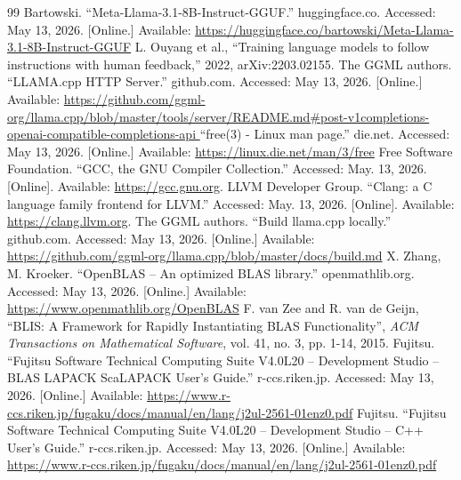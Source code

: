 \documentclass[11pt, a4paper]{article}
\begin{document}
\begin{thebibliography}{99}
        Bartowski.
        ``Meta-Llama-3.1-8B-Instruct-GGUF.''
        huggingface.co.
        Accessed: May 13, 2026. [Online.] Available:
        \url{https://huggingface.co/bartowski/Meta-Llama-3.1-8B-Instruct-GGUF}
        L. Ouyang et al.,
        ``Training language models to follow instructions with human feedback,''
        2022, arXiv:2203.02155.
        The GGML authors.
        ``LLAMA.cpp HTTP Server.''
        github.com.
        Accessed: May 13, 2026. [Online.] Available:
        \url{
            https://github.com/ggml-org/llama.cpp/blob/master/tools/server/README.md#post-v1completions-openai-compatible-completions-api
        }
        ``free(3) - Linux man page.''
        die.net.
        Accessed: May 13, 2026. [Online.] Available:
        \url{https://linux.die.net/man/3/free}
        Free Software Foundation.
        ``GCC, the GNU Compiler Collection.''
        Accessed: May. 13, 2026. [Online]. Available:
        \url{https://gcc.gnu.org}.
        LLVM Developer Group.
        ``Clang: a C language family frontend for LLVM.''
        Accessed: May. 13, 2026. [Online]. Available:
        \url{https://clang.llvm.org}.
        The GGML authors.
        ``Build llama.cpp locally.''
        github.com.
        Accessed: May 13, 2026. [Online.] Available:
        \url{https://github.com/ggml-org/llama.cpp/blob/master/docs/build.md}
        X. Zhang, M. Kroeker.
        ``OpenBLAS -- An optimized BLAS library.''
        openmathlib.org.
        Accessed: May 13, 2026. [Online.] Available:
        \url{https://www.openmathlib.org/OpenBLAS}
        F. van Zee and R. van de Geijn,
        ``BLIS: A Framework for Rapidly Instantiating BLAS Functionality'',
        \emph{ACM Transactions on Mathematical Software}, vol. 41, no. 3, pp. 1-14, 2015.
        Fujitsu.
        ``Fujitsu Software Technical Computing Suite V4.0L20 -- Development Studio -- BLAS LAPACK ScaLAPACK User's Guide.''
        r-ccs.riken.jp.
        Accessed: May 13, 2026. [Online.] Available:
        \url{https://www.r-ccs.riken.jp/fugaku/docs/manual/en/lang/j2ul-2561-01enz0.pdf}
        Fujitsu.
        ``Fujitsu Software Technical Computing Suite V4.0L20 -- Development Studio -- C++ User's Guide.''
        r-ccs.riken.jp.
        Accessed: May 13, 2026. [Online.] Available:
        \url{https://www.r-ccs.riken.jp/fugaku/docs/manual/en/lang/j2ul-2561-01enz0.pdf}

\end{thebibliography}
\end{document}
